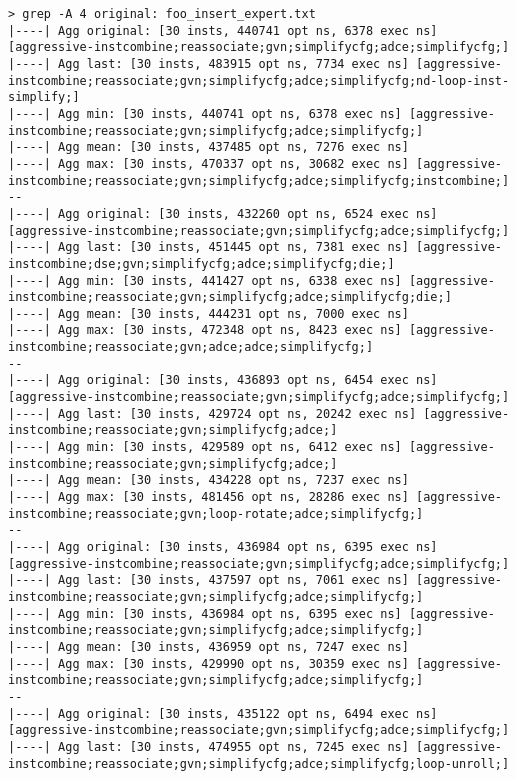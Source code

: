 \documentclass{vldb}
\begin{document}
\begin{lstlisting}
> grep -A 4 original: foo_insert_expert.txt  
|----| Agg original: [30 insts, 440741 opt ns, 6378 exec ns] [aggressive-instcombine;reassociate;gvn;simplifycfg;adce;simplifycfg;]
|----| Agg last: [30 insts, 483915 opt ns, 7734 exec ns] [aggressive-instcombine;reassociate;gvn;simplifycfg;adce;simplifycfg;nd-loop-inst-simplify;]
|----| Agg min: [30 insts, 440741 opt ns, 6378 exec ns] [aggressive-instcombine;reassociate;gvn;simplifycfg;adce;simplifycfg;]
|----| Agg mean: [30 insts, 437485 opt ns, 7276 exec ns]
|----| Agg max: [30 insts, 470337 opt ns, 30682 exec ns] [aggressive-instcombine;reassociate;gvn;simplifycfg;adce;simplifycfg;instcombine;]
--
|----| Agg original: [30 insts, 432260 opt ns, 6524 exec ns] [aggressive-instcombine;reassociate;gvn;simplifycfg;adce;simplifycfg;]
|----| Agg last: [30 insts, 451445 opt ns, 7381 exec ns] [aggressive-instcombine;dse;gvn;simplifycfg;adce;simplifycfg;die;]
|----| Agg min: [30 insts, 441427 opt ns, 6338 exec ns] [aggressive-instcombine;reassociate;gvn;simplifycfg;adce;simplifycfg;die;]
|----| Agg mean: [30 insts, 444231 opt ns, 7000 exec ns]
|----| Agg max: [30 insts, 472348 opt ns, 8423 exec ns] [aggressive-instcombine;reassociate;gvn;adce;adce;simplifycfg;]
--
|----| Agg original: [30 insts, 436893 opt ns, 6454 exec ns] [aggressive-instcombine;reassociate;gvn;simplifycfg;adce;simplifycfg;]
|----| Agg last: [30 insts, 429724 opt ns, 20242 exec ns] [aggressive-instcombine;reassociate;gvn;simplifycfg;adce;]
|----| Agg min: [30 insts, 429589 opt ns, 6412 exec ns] [aggressive-instcombine;reassociate;gvn;simplifycfg;adce;]
|----| Agg mean: [30 insts, 434228 opt ns, 7237 exec ns]
|----| Agg max: [30 insts, 481456 opt ns, 28286 exec ns] [aggressive-instcombine;reassociate;gvn;loop-rotate;adce;simplifycfg;]
--
|----| Agg original: [30 insts, 436984 opt ns, 6395 exec ns] [aggressive-instcombine;reassociate;gvn;simplifycfg;adce;simplifycfg;]
|----| Agg last: [30 insts, 437597 opt ns, 7061 exec ns] [aggressive-instcombine;reassociate;gvn;simplifycfg;adce;simplifycfg;]
|----| Agg min: [30 insts, 436984 opt ns, 6395 exec ns] [aggressive-instcombine;reassociate;gvn;simplifycfg;adce;simplifycfg;]
|----| Agg mean: [30 insts, 436959 opt ns, 7247 exec ns]
|----| Agg max: [30 insts, 429990 opt ns, 30359 exec ns] [aggressive-instcombine;reassociate;gvn;simplifycfg;adce;simplifycfg;]
--
|----| Agg original: [30 insts, 435122 opt ns, 6494 exec ns] [aggressive-instcombine;reassociate;gvn;simplifycfg;adce;simplifycfg;]
|----| Agg last: [30 insts, 474955 opt ns, 7245 exec ns] [aggressive-instcombine;reassociate;gvn;simplifycfg;adce;simplifycfg;loop-unroll;]

\end{lstlisting}
\end{document}
